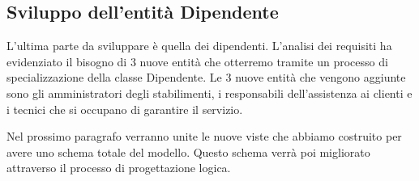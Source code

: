 \documentclass[11pt,a4paper] {article}
\begin{document}
\newpage
\subsection{Sviluppo dell'entit\`a Dipendente}
L'ultima parte da sviluppare è quella dei dipendenti. L'analisi dei requisiti ha evidenziato il bisogno di 3 nuove entit\`a che otterremo tramite un processo di specializzazione della classe Dipendente.
Le 3 nuove entità che vengono aggiunte sono gli amministratori degli stabilimenti, i responsabili dell'assistenza ai clienti e i tecnici che si occupano di garantire il servizio.

\begin{figure}[!h]
\centering
{}
\end{figure}


Nel prossimo paragrafo verranno unite le nuove viste che abbiamo costruito per avere uno schema totale del modello. Questo schema verrà poi migliorato attraverso il processo di progettazione logica.

\newpage
\end{document}
